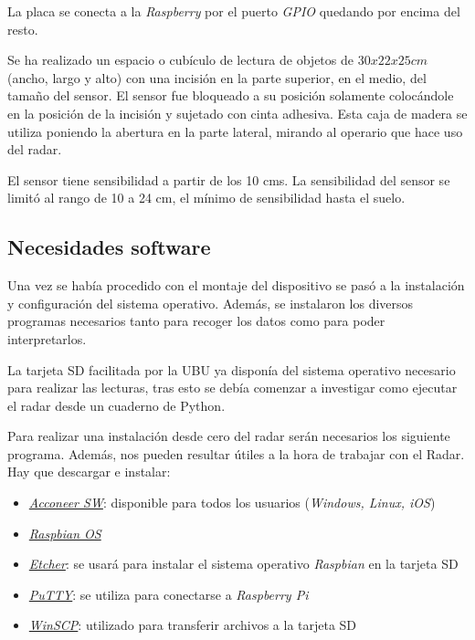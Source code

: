 La placa se conecta a la \textit{Raspberry} por el puerto \textit{GPIO} quedando por encima del resto.


Se ha realizado un espacio o cubículo de lectura de objetos de $30x22x25 cm$ (ancho, largo y alto) con una incisión en la parte superior, en el medio, del tamaño del sensor. El sensor fue bloqueado a su posición solamente colocándole en la posición de la incisión y sujetado con cinta adhesiva. Esta caja de madera se utiliza poniendo la abertura en la parte lateral, mirando al operario que hace uso del radar.
 
El sensor tiene sensibilidad a partir de los 10 cms. La sensibilidad del sensor se limitó al rango de 10 a 24 cm, el mínimo de sensibilidad hasta el suelo.


\subsection{Necesidades software}

Una vez se había procedido con el montaje del dispositivo se pasó a la instalación y configuración del sistema operativo. Además, se instalaron los diversos programas necesarios tanto para recoger los datos como para poder interpretarlos.

La tarjeta SD facilitada por la UBU ya disponía del sistema operativo necesario para realizar las lecturas, tras esto se debía comenzar a investigar como ejecutar el radar desde un cuaderno de Python.

Para realizar una instalación desde cero del radar serán necesarios los siguiente programa. Además, nos pueden resultar útiles a la hora de trabajar con el Radar. 
Hay que descargar e instalar: 
\begin{itemize}
\item \href{http://developer.acconeer.com}{\textit{Acconeer SW}}: disponible para todos los usuarios (\textit{Windows, Linux, iOS}) 
\item \href{www.raspberrypi.org}{\textit{Raspbian OS}} 
\item \href{http://www.etcher.io}{\textit{Etcher}}: se usará para instalar el sistema operativo \textit{Raspbian} en la tarjeta SD
\item \href{http://www.putty.org}{\textit{PuTTY}}: se utiliza para conectarse a \textit{Raspberry Pi}
\item \href{http://www.winscp.net}{\textit{WinSCP}}: utilizado para transferir archivos a la tarjeta SD
\end{itemize}
 
